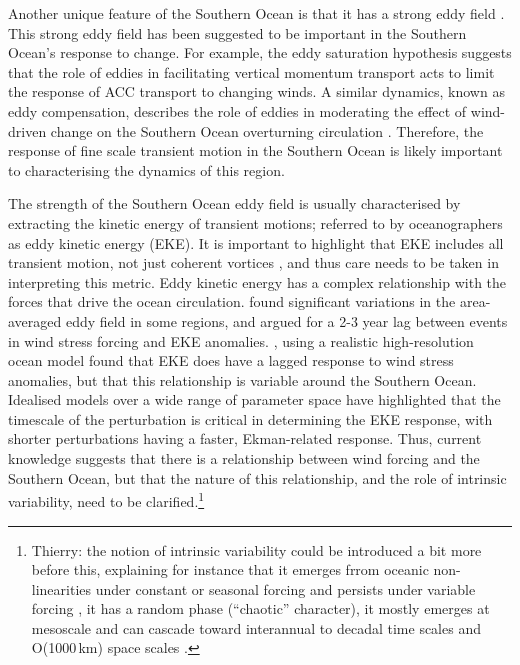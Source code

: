 \documentclass{agujournal2019}
\begin{document}
Another unique feature of the Southern Ocean is that it has a strong eddy field \citep{Fu2010}.
This strong eddy field has been suggested to be important in the Southern Ocean's response to change.
For example, the eddy saturation hypothesis \citep{Hallberg2006, Meredith-Hogg-2006, Munday2013, Constantinou2019} suggests that the role of eddies in facilitating vertical momentum transport acts to limit the response of ACC transport to changing winds.
A similar dynamics, known as eddy compensation, describes the role of eddies in moderating the effect of wind-driven change on the Southern Ocean overturning circulation \citep{Morrison2013a}.
Therefore, the response of fine scale transient motion in the Southern Ocean is likely important to characterising the dynamics of this region.

The strength of the Southern Ocean eddy field is usually characterised by extracting the kinetic energy of transient motions; referred to by oceanographers as eddy kinetic energy (EKE). 
It is important to highlight that EKE includes all transient motion, not just coherent vortices \citep{Martinez-Moreno2019}, and thus care needs to be taken in interpreting this metric.
Eddy kinetic energy has a complex relationship with the forces that drive the ocean circulation.
\citet{Meredith-Hogg-2006} found significant variations in the area-averaged eddy field in some regions, and argued for a 2-3 year lag between events in wind stress forcing and EKE anomalies.
\citet{Patara2016}, using a realistic high-resolution ocean model found that EKE does have a lagged response to wind stress anomalies, but that this relationship is variable around the Southern Ocean.
Idealised models over a wide range of parameter space \citep{Sinha2016} have highlighted that the timescale of the perturbation is critical in determining the EKE response, with shorter perturbations having a faster, Ekman-related response.
Thus, current knowledge suggests that there is a relationship between wind forcing and the Southern Ocean, but that the nature of this relationship, and the role of intrinsic variability, need to be clarified.\footnote{{\color{red}Thierry: the notion of intrinsic variability could be introduced a bit more before this, explaining for instance that it emerges frrom oceanic non-linearities under constant or seasonal forcing and persists under variable forcing \citep{Leroux2018}, it has a random phase (``chaotic'' character), it mostly emerges at mesoscale and can cascade toward interannual to decadal time scales and O(1000$\,$km) space scales \cite{Serazin-etal-2018}.}}
\end{document}
